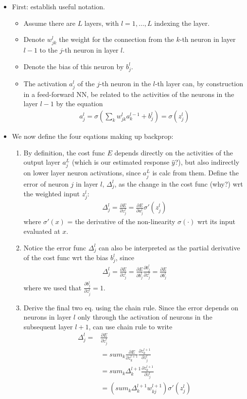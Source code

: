 \documentclass[norsk,a4paper,11pt]{article}
\begin{document}
\begin{itemize}
	\item First: establish useful notation.
	\begin{itemize}
		\item Assume there are $L$ layers, with $l=1,...,L$ indexing the layer. 
		\item Denote $w_{jk}^l$ the weight for the connection from the $k$-th neuron in layer $l-1$ to the $j$-th neuron in layer $l$. 
		\item Denote the bias of this neuron by $b_j^l$. 
		\item The activation $a_j^l$ of the $j$-th neuron in the $l$-th layer can, by construction in a feed-forward NN, be related to the activities of the neurons in the layer $l-1$ by the equation
		\begin{align}
			a_j^l = \sigma (\sum_k w_{jk}^l a_k^{l-1} + b_j^l) = \sigma(z_j^l)
		\end{align}
	\end{itemize}
	\item We now define the four eqations making up backprop:
	\begin{enumerate}
		\item By definition, the cost func $E$ depends directly on the activities of the output layer $a_j^L$ (which is our estimated response $\hat{y}$?), but also indirectly on lower layer neuron activations, since $a_j^L$ is calc from them.
		Define the error of neuron $j$ in layer $l$, $\Delta_j^l$, as the change in the cost func (why?) wrt the weighted input $z_j^l$:
		\begin{align}
			\Delta_j^l = \frac{\partial E}{\partial z_j^l} = \frac{\partial E}{\partial a_j^l} \sigma' (z_j^l)
		\end{align}
		where $\sigma'(x)$ = the derivative of the non-linearity $\sigma(\cdot)$ wrt its input evaluated at $x$.
		\item Notice the error func $\Delta_j^l$ can also be interpreted as the partial derivative of the cost func wrt the bias $b_j^l$, since
		\begin{align}
			\Delta_j^l = \frac{\partial E}{\partial z_j^l} = \frac{\partial E}{\partial b_j^l} \frac{\partial b_j^l}{\partial z_j^l} = \frac{\partial E}{\partial b_j^l}
		\end{align}
		where we used that $\frac{\partial b_j^l}{\partial z_j^l} = 1$.
		\item Derive the final two eq. using the chain rule. Since the error depends on neurons in layer $l$ only through the activation of neurons in the subsequent layer $l+1$, can use chain rule to write
		\begin{align}
			\Delta_j^l =& \frac{\partial E}{\partial z_j^l} \\
			&= sum_k \frac{\partial E}{\partial z_k^{l+1}} \frac{\partial z_k^{l+1}}{\partial z_j^l} \\
			&= sum_k \Delta_k^{l+1} \frac{\partial z_k^{l+1}}{\partial z_j^l} \\
			&= (sum_k \Delta_k^{l+1} w_{kj}^{l+1})\sigma' (z_j^l)
		\end{align}


\end{enumerate}
\end{itemize}
\end{document}
